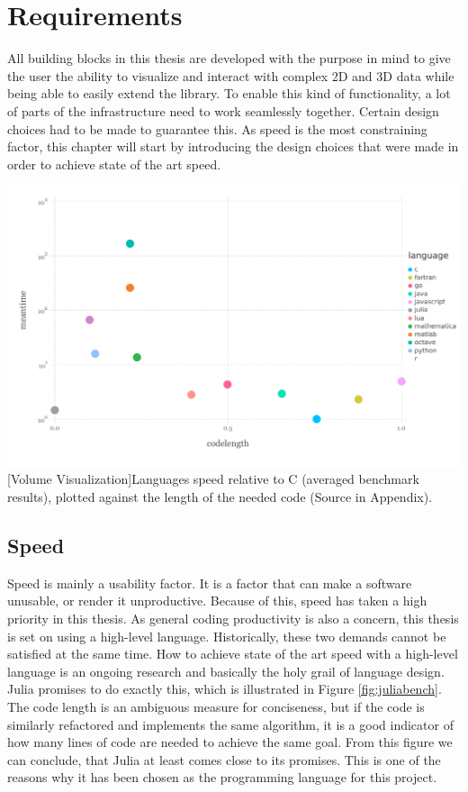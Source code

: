 \section{Requirements}

All building blocks in this thesis are developed with the purpose in mind to give the user the ability to visualize and interact with complex 2D and 3D data while being able to easily extend the library.
To enable this kind of functionality, a lot of parts of the infrastructure need to work seamlessly together.
Certain design choices had to be made to guarantee this. As speed is the most constraining factor, this chapter will start by introducing the design choices that were made in order to achieve state of the art speed.

\vspace{1em}
\begin{minipage}{\linewidth}
    \centering
    \includegraphics[width=0.9\linewidth]{graphics/julia_bench.pdf}
    [Volume Visualization]{Languages speed relative to C (averaged benchmark results), plotted against the length of the needed code (Source in Appendix).}
    \label{fig:juliabench}
\end{minipage}


\subsection{Speed}
Speed is mainly a usability factor. It is a factor that can make a software unusable, or render it unproductive. Because of this, speed has taken a high priority in this thesis. 
As general coding productivity is also a concern, this thesis is set on using a high-level language.
Historically, these two demands cannot be satisfied at the same time.
How to achieve state of the art speed with a high-level language is an ongoing research and basically the holy grail of language design. 
Julia promises to do exactly this, which is illustrated in Figure \ref{fig:juliabench}. 
The code length is an ambiguous measure for conciseness, but if the code is similarly refactored and implements the same algorithm, it is a good indicator of how many lines of code are needed to achieve the same goal.
From this figure we can conclude, that Julia at least comes close to its promises. This is one of the reasons why it has been chosen as the programming language for this project.

